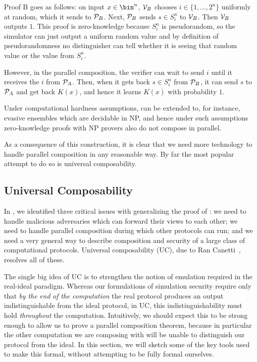 Proof B goes as follows: on input $x\in\bin^n$, $\mathcal{V}_B$ chooses
$i\in\{1,\dots,2^n\}$ uniformly at random, which it sends to $\mathcal{P}_B$. Next,
$\mathcal{P}_B$ sends $s\in S^n_i$ to $\mathcal{V}_B$. Then $\mathcal{V}_B$ outputs $1$. 
This proof is zero-knowledge because $S^n_i$ is pseudorandom, so the simulator can
just output a uniform random value and by definition of pseudorandomness no
distinguisher can tell whether it is seeing that random value or the value from
$S^n_i$.

However, in the parallel composition, the verifier can wait to send $i$ until it
receives the $i$ from $\mathcal{P}_A$. Then, when it gets back $s\in S^n_i$ from
$\mathcal{P}_B$, it can send $s$ to $\mathcal{P}_A$ and get back $K(x)$, and hence it learns
$K(x)$ with probability $1$.

Under computational hardness assumptions, 
can be extended to,
for instance, evasive ensembles which are decidable in NP, and hence under such
assumptions zero-knowledge proofs with NP provers also do not compose in
parallel.

As a consequence of this construction, it is clear that we need more technology
to handle parallel composition in any reasonable way. By far the most popular
attempt to do so is universal composability.

\subsection{Universal Composability}
\label{sec:uc}

In
,
we identified three critical issues with generalizing the proof of
:
we need to handle malicious adversaries which can forward their views to each
other; we need to handle parallel composition during which other protocols can
run; and we need a very general way to describe composition and security of a
large class of computational protocols. Universal composability (UC), due to Ran
Canetti~\cite{canetti-2000,canetti-2020}, resolves all of these.

The single big idea of UC is to strengthen the notion of emulation required in
the real-ideal paradigm. Whereas our formulations of simulation security require
only that \emph{by the end of the computation} the real protocol produces an output
indistinguishable from the ideal protocol, in UC, this indistinguishability must
hold \emph{throughout} the computation. Intuitively, we should expect this to be
strong enough to allow us to prove a parallel composition theorem, because
in particular the other computation we are composing with will be unable to
distinguish our protocol from the ideal. In this section, we will sketch some of
the key tools used to make this formal, without attempting to be fully formal
ourselves.

